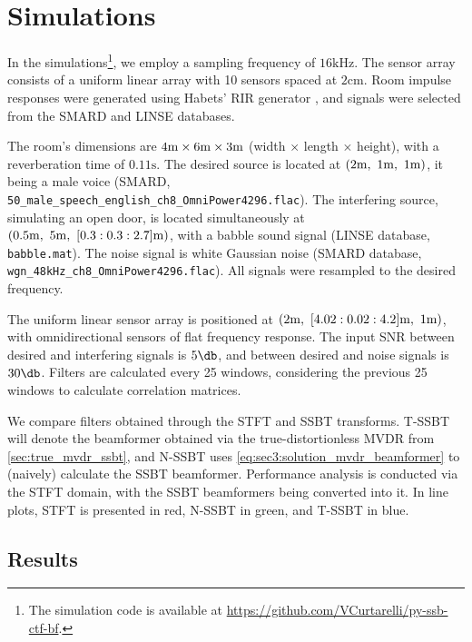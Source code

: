 
\section{Simulations}
\label{sec:results}

In the simulations\footnote{The simulation code is available at \url{https://github.com/VCurtarelli/py-ssb-ctf-bf}.}, we employ a sampling frequency of $16\si{\kilo\hertz}$. The sensor array consists of a uniform linear array with 10 sensors spaced at $2\si{\cm}$. Room impulse responses were generated using Habets' RIR generator \cite{habets_rir-generator}, and signals were selected from the SMARD \cite{smard_database} and LINSE \cite{linse_database} databases.

The room's dimensions are $4\si{\meter} \times 6\si{\meter} \times 3\si{\meter}$ (width $\times$ length $\times$ height), with a reverberation time of $0.11\si{\second}$. The desired source is located at $(2\si{\meter},~1\si{\meter},~1\si{\meter})$, it being a male voice (SMARD, \texttt{50\_male\_speech\_english\_ch8\_OmniPower4296.flac}).
%
The interfering source, simulating an open door, is located simultaneously at $(0.5\si{\meter},~5\si{\meter},~[0.3:0.3:2.7]\si{\meter})$, with a babble sound signal (LINSE database, \texttt{babble.mat}). The noise signal is white Gaussian noise (SMARD database, \texttt{wgn\_48kHz\_ch8\_OmniPower4296.flac}). All signals were resampled to the desired frequency.

The uniform linear sensor array is positioned at $(2\si{\meter},~[4.02:0.02:4.2]\si{\meter},~1\si{\meter})$, with omnidirectional sensors of flat frequency response. The input SNR between desired and interfering signals is $5\dB$, and between desired and noise signals is $30\dB$. Filters are calculated every 25 windows, considering the previous 25 windows to calculate correlation matrices.

We compare filters obtained through the STFT and SSBT transforms. T-SSBT will denote the beamformer obtained via the true-distortionless MVDR from \cref{sec:true_mvdr_ssbt}, and N-SSBT uses \cref{eq:sec3:solution_mvdr_beamformer} to (naively) calculate the SSBT beamformer. Performance analysis is conducted via the STFT domain, with the SSBT beamformers being converted into it. In line plots, STFT is presented in red, N-SSBT in green, and T-SSBT in blue.


\subsection{Results}

